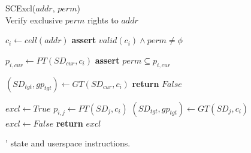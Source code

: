 \begin{figure}
\begin{multicols}{2}
    \begin{algorithm}[H]
      \caption{SCExcl($addr$, $perm$) \\
      Verify exclusive $perm$ rights to $addr$       }
      \begin{algorithmic}[1]

        \State $c_i \gets cell(addr)$
        \State \textbf{assert} $valid(c_i) \land perm \ne \phi$

        \State $p_{i,cur} \gets PT(SD_{cur}, c_i) $
        \State \textbf{assert} $perm \subseteq p_{i,cur}$

        \State $ (SD_{tgt}, gp_{tgt}) \gets GT(SD_{cur}, c_i)$
          \State \textbf{return} $False$
        \EndIf

        \State $excl \gets True$
          \State $p_{i,j} \gets PT(SD_j, c_i)$
          \State $(SD_{tgt}, gp_{tgt}) \gets GT(SD_j, c_i)$
            \State $excl \gets False$
          \EndIf
        \EndFor
        \State \textbf{return} $excl$
      \end{algorithmic}
      \label{alg:seccells:sccount}
    \end{algorithm}
    \vspace{-\baselineskip}
  \end{multicols}

  \caption[\seccells: State and userspace instructions.]
          {\seccells' state and userspace instructions.}
  \label{fig:seccells:seccell_ops_formal}
\end{figure}
